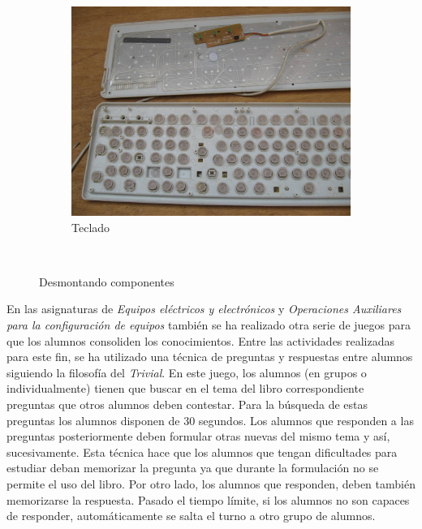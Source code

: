 \documentclass[spanish,12pt, a4paper,twoside]{paper}
\begin{document}
\begin{figure}
\begin{subfigure}[b]{0.3\textwidth}
\end{subfigure}
\begin{subfigure}[b]{0.3\textwidth}
\includegraphics[width=\textwidth]{recursos/teclado.jpg}
\caption{Teclado}
\end{subfigure}
~ %
\caption{Desmontando componentes}
\end{figure}
\FloatBarrier

En las asignaturas de \textit{Equipos eléctricos y electrónicos} y \textit{Operaciones Auxiliares para la configuración de equipos} también se ha realizado otra serie de juegos para que los alumnos consoliden los conocimientos. Entre las actividades realizadas para este fin, se ha utilizado una técnica de preguntas y respuestas entre alumnos siguiendo la filosofía del \textit{Trivial}. En este juego, los alumnos (en grupos o individualmente) tienen que buscar en el tema del libro correspondiente preguntas que otros alumnos deben contestar. Para la búsqueda de estas preguntas los alumnos disponen de 30 segundos. Los alumnos que responden a las preguntas posteriormente deben formular otras nuevas del mismo tema y así, sucesivamente. Esta técnica hace que los alumnos que tengan dificultades para estudiar deban memorizar la pregunta ya que durante la formulación no se permite el uso del libro. Por otro lado, los alumnos que responden, deben también memorizarse la respuesta. Pasado el tiempo límite, si los alumnos no son capaces de responder, automáticamente se salta el turno a otro grupo de alumnos.
\end{document}

